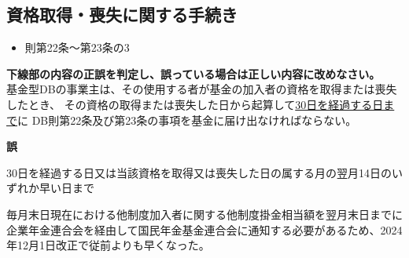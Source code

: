 \subsection{資格取得・喪失に関する手続き}

\begin{InyouJobunbox}
  \begin{itemize}
    \item 則第22条〜第23条の3
  \end{itemize}
\end{InyouJobunbox}

\begin{truefalse}[自作 2026/10/11]
    \textbf{下線部の内容の正誤を判定し、誤っている場合は正しい内容に改めなさい。}
  \\
  
  基金型DBの事業主は、その使用する者が基金の加入者の資格を取得または喪失したとき、
  その資格の取得または喪失した日から起算して\underline{30日を経過する日まで}に
  DB則第22条及び第23条の事項を基金に届け出なければならない。
\end{truefalse}

\begin{answerbox}
  \textbf{誤}

  30日を経過する日又は当該資格を取得又は喪失した日の属する月の翌月14日のいずれか早い日まで
\end{answerbox}

\begin{explanationbox}
  毎月末日現在における他制度加入者に関する他制度掛金相当額を翌月末日までに企業年金連合会を経由して国民年金基金連合会に通知する必要があるため、2024年12月1日改正で従前よりも早くなった。
\end{explanationbox}

\newpage
